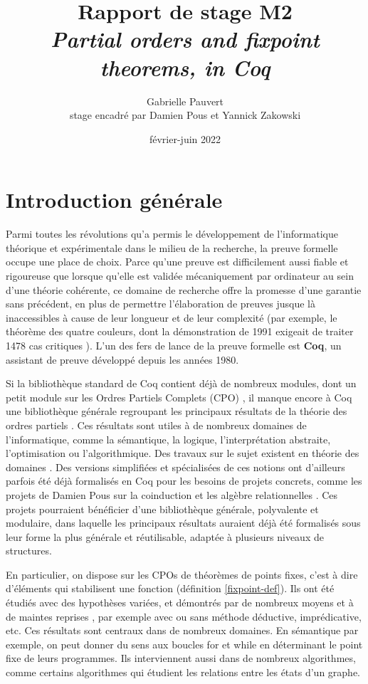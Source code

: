 \documentclass{article}
\title{Rapport de stage M2 \\ 
\textit{Partial orders and fixpoint theorems, in Coq}}
\date{février-juin 2022}
\author{Gabrielle Pauvert\\
stage encadré par Damien Pous et Yannick Zakowski}
\theoremstyle{definition}
\begin{document}
\maketitle

\section*{Introduction générale}

Parmi toutes les révolutions qu'a permis le développement de l'informatique théorique et expérimentale dans le milieu de la recherche, la preuve formelle occupe une place de choix. Parce qu'une preuve est difficilement aussi fiable et rigoureuse que lorsque qu'elle est validée mécaniquement par ordinateur au sein d'une théorie cohérente, ce domaine de recherche offre la promesse d'une garantie sans précédent, en plus de permettre l'élaboration de preuves jusque là inaccessibles à cause de leur longueur et de leur complexité (par exemple, le théorème des quatre couleurs, dont la démonstration de 1991 exigeait de traiter 1478 cas critiques \cite{4color}). L'un des fers de lance de la preuve formelle est \textbf{Coq}, un assistant de preuve développé depuis les années 1980.

Si la bibliothèque standard de Coq contient déjà de nombreux modules, dont un petit module sur les Ordres Partiels Complets (CPO) \cite{coqCPO}, il manque encore à Coq une bibliothèque générale regroupant les principaux résultats de la théorie des ordres partiels \cite{main}. Ces résultats sont utiles à de nombreux domaines de l'informatique, comme la sémantique, la logique, l'interprétation abstraite, l'optimisation ou l'algorithmique. Des travaux sur le sujet existent en théorie des domaines \cite{dockins}. Des versions simplifiées et spécialisées de ces notions ont d'ailleurs parfois été déjà formalisés en Coq pour les besoins de projets concrets, comme les projets de Damien Pous sur la coinduction \cite{coind-theory} %
et les algèbre relationnelles \cite{relalg}. Ces projets pourraient bénéficier d'une bibliothèque générale, polyvalente et modulaire, dans laquelle les principaux résultats auraient déjà été formalisés sous leur forme la plus générale et réutilisable, adaptée à plusieurs niveaux de structures.


En particulier, on dispose sur les CPOs de théorèmes de points fixes, c'est à dire d'éléments qui stabilisent une fonction (définition \ref{fixpoint-def}). Ils ont été étudiés avec des hypothèses variées, et démontrés par de nombreux moyens et à de maintes reprises \cite{main} \cite{proofs} \cite{ktnote}, par exemple avec ou sans méthode déductive, imprédicative, etc. Ces résultats sont centraux dans de nombreux domaines. En sémantique par exemple, on peut donner du sens aux boucles for et while en déterminant le point fixe de leurs programmes. Ils interviennent aussi dans de nombreux algorithmes, comme certains algorithmes qui étudient les relations entre les états d'un graphe.
\end{document}
